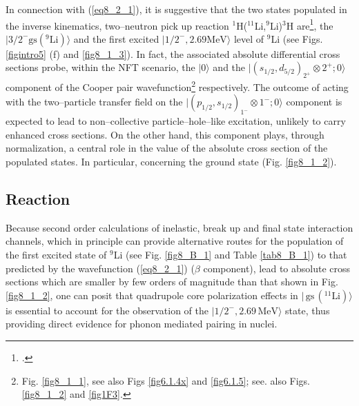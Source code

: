  In connection with  (\ref{eq8_2_1}), it is suggestive that the two states populated in the  inverse kinematics, two--neutron pick up reaction $^1$H($^{11}$Li,$^9$Li)$^3$H are\footnote{\cite{Tanihata:08}.}, the $|3/2^-\text{gs}(^9\text{Li})\rangle$ and the first excited $|1/2^-,2.69\text{MeV}\rangle$ level of $^9$Li  (see Figs. \ref{figintro5} (f) and \ref{fig8_1_3}). In fact, the associated absolute differential cross sections probe, within the NFT scenario, the $|0\rangle$  and the $|(s_{1/2},d_{5/2})_{2^+}\otimes 2^+;0\rangle$ component of the Cooper pair wavefunction\footnote{Fig. \ref{fig8_1_1}, see also Figs \ref{fig6.1.4x} and \ref{fig6.1.5}; see. also Figs. \ref{fig8_1_2} and \ref{fig1F3}.} respectively. The outcome of acting with the two--particle transfer field on the $|(p_{1/2},s_{1/2})_{1^-}\otimes 1^-;0\rangle$ component is expected to lead to non--collective particle--hole--like excitation, unlikely to carry enhanced cross sections. On the other hand, this component plays, through normalization, a central role in the value of the absolute cross section of the populated states. In particular, concerning the ground state (Fig. \ref{fig8_1_2}).  
 
 
 
\subsection{Reaction}\label{C6S1.2}
Because second order calculations of inelastic, break up and final state interaction channels, which in principle can provide alternative routes for the population of the first excited state of $^9$Li (see Fig. \ref{fig8_B_1} and Table \ref{tab8_B_1}) to that predicted by the wavefunction (\ref{eq8_2_1})  ($\beta$ component), lead to absolute cross sections which are smaller by few orders of magnitude than that shown in Fig. \ref{fig8_1_2}, one can posit that quadrupole core polarization effects in $|\,\text{gs}\,(^{11}\text{Li})\rangle$ is essential to account for the observation of the $|1/2^-,2.69\,\text{MeV}\rangle$ state, thus providing
 direct evidence for phonon mediated pairing in nuclei. 
 
